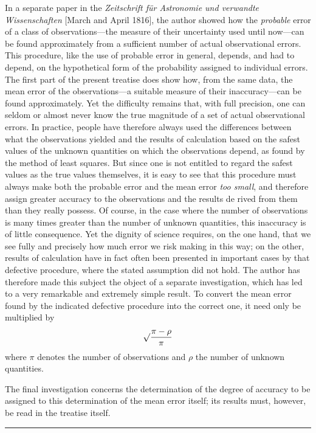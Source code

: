In a separate paper in the \textit{Zeitschrift für Astronomie und verwandte Wissenschaften} [March and April 1816], the author showed how the \textit{probable} error of a class of observations—the measure of their uncertainty used until now—can be found approximately from a sufficient number of actual observational errors. This procedure, like the use of probable error in general, depends, and had to depend, on the hypothetical form of the probability assigned to individual errors. The first part of the present treatise does show how, from the same data, the mean error of the observations—a suitable measure of their inaccuracy—can be found approximately. Yet the difficulty remains that, with full precision, one can seldom or almost never know the true magnitude of a set of actual observational errors. In practice, people have therefore always used the differences between what the observations yielded and the results of calculation based on the safest values of the unknown quantities on which the observations depend, as found by the method of least squares. But since one is not entitled to regard the safest values as the true values themselves, it is easy to see that this procedure must always make both the probable error and the mean error \textit{too small}, and therefore assign greater accuracy to the observations and the results de%
rived from them than they really possess. Of course, in the case where the number of observations is many times greater than the number of unknown quantities, this inaccuracy is of little consequence. Yet the dignity of science requires, on the one hand, that we see fully and precisely how much error we risk making in this way; on the other, results of calculation have in fact often been presented in important cases by that defective procedure, where the stated assumption did not hold. The author has therefore made this subject the object of a separate investigation, which has led to a very remarkable and extremely simple result. To convert the mean error found by the indicated defective procedure into the correct one, it need only be multiplied by
\[
\surd\frac{\pi-\rho}{\pi}
\]
where \(\pi\) denotes the number of observations and \(\rho\) the number of unknown quantities.

The final investigation concerns the determination of the degree of accuracy to be assigned to this determination of the mean error itself; its results must, however, be read in the treatise itself.
\par\bigskip
\begin{center}
\rule{.88\textwidth}{.3pt}\par
\end{center}
